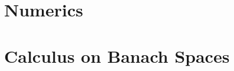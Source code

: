 \documentclass[final]{nddiss2e}
\begin{document}
\tableofcontents




\mainmatter
 
 
 \chapter{Numerics}
\appendix
\chapter{Calculus on Banach Spaces}

\end{document}
